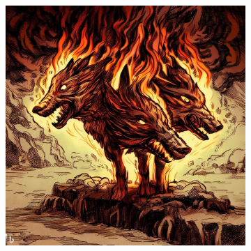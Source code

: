 \documentclass[11pt, twoside]{article}
\begin{document}
\begin{figure}[H]
\begin{subfigure}{0.3\textwidth}
  \end{subfigure}%
  \begin{subfigure}{0.3\textwidth}
    \centering
    \includegraphics[width=0.99\linewidth]{dogo3.jpeg}
  \end{subfigure}
\end{figure}
\end{document}
